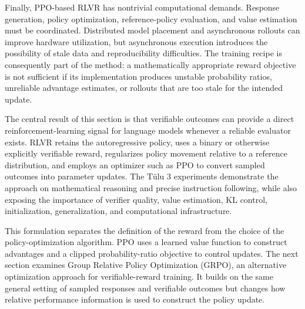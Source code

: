 Finally, PPO-based RLVR has nontrivial computational demands. Response
generation, policy optimization, reference-policy evaluation, and value
estimation must be coordinated. Distributed model placement and asynchronous
rollouts can improve hardware utilization, but asynchronous execution
introduces the possibility of stale data and reproducibility difficulties.
The training recipe is consequently part of the method: a mathematically
appropriate reward objective is not sufficient if its implementation
produces unstable probability ratios, unreliable advantage estimates, or
rollouts that are too stale for the intended update.

The central result of this section is that verifiable outcomes can provide
a direct reinforcement-learning signal for language models whenever a
reliable evaluator exists. RLVR retains the autoregressive policy, uses a
binary or otherwise explicitly verifiable reward, regularizes policy
movement relative to a reference distribution, and employs an optimizer
such as PPO to convert sampled outcomes into parameter updates. The Tülu 3
experiments demonstrate the approach on mathematical reasoning and precise
instruction following, while also exposing the importance of verifier
quality, value estimation, KL control, initialization, generalization, and
computational infrastructure.

This formulation separates the definition of the reward from the choice of
the policy-optimization algorithm. PPO uses a learned value function to
construct advantages and a clipped probability-ratio objective to control
updates. The next section examines Group Relative Policy Optimization
(GRPO), an alternative optimization approach for verifiable-reward
training. It builds on the same general setting of sampled responses and
verifiable outcomes but changes how relative performance information is
used to construct the policy update.
